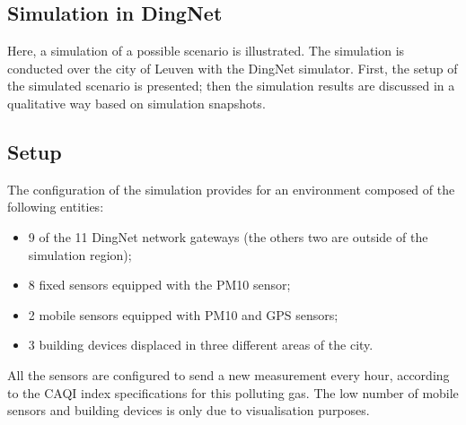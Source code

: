 

\subsection{Simulation in DingNet}
Here, a simulation of a possible scenario is illustrated. 
The simulation is conducted over the city of Leuven with the DingNet simulator.
First, the setup of the simulated scenario is presented; then the simulation results are discussed in a qualitative way based on simulation snapshots.
\subsection*{Setup}
The configuration of the simulation provides for an environment composed of the following entities:
\begin{itemize}
    \item 9 of the 11 DingNet network gateways (the others two are outside of the simulation region);
    \item 8 fixed sensors equipped with the PM10 sensor;
    \item 2 mobile sensors equipped with PM10 and GPS sensors;
    \item 3 building devices displaced in three different areas of the city.
\end{itemize}
All the sensors are configured to send a new measurement every hour, according to the CAQI index specifications for this polluting gas.
The low number of mobile sensors and building devices is only due to visualisation purposes. 

